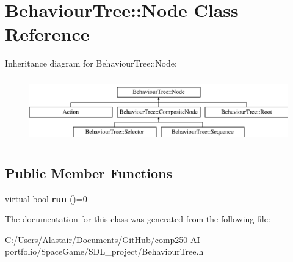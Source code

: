 \hypertarget{class_behaviour_tree_1_1_node}{}\section{Behaviour\+Tree\+:\+:Node Class Reference}
\label{class_behaviour_tree_1_1_node}
Inheritance diagram for Behaviour\+Tree\+:\+:Node\+:\begin{figure}[H]
\begin{center}
\leavevmode
\includegraphics[height=2.828283cm]{class_behaviour_tree_1_1_node}
\end{center}
\end{figure}
\subsection*{Public Member Functions}
\begin{DoxyCompactItemize}
\item 
\mbox{\label{class_behaviour_tree_1_1_node_a33b757627e0894459fa910443a15a44d}} 
virtual bool {\bfseries run} ()=0
\end{DoxyCompactItemize}


The documentation for this class was generated from the following file\+:\begin{DoxyCompactItemize}
\item 
C\+:/\+Users/\+Alastair/\+Documents/\+Git\+Hub/comp250-\/\+A\+I-\/portfolio/\+Space\+Game/\+S\+D\+L\+\_\+project/Behaviour\+Tree.\+h\end{DoxyCompactItemize}
